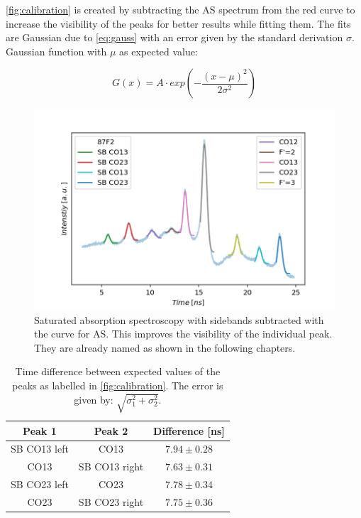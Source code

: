 \documentclass[]{article}
\begin{document}
\autoref{fig:calibration} is created by subtracting the AS spectrum from the red curve to increase the visibility of the peaks for better results while fitting them. The fits are Gaussian due to \autoref{eq:gauss} with an error given by the standard derivation $\sigma$. Gaussian function with $\mu$ as expected value:

\begin{equation}
G(x) = A \cdot exp\left( -\frac{(x-\mu)^2}{2\sigma^2} \right)
\end{equation}

\begin{figure}[H]
\centering
\includegraphics[width=.8\textwidth]{Plots/Calibration_Second_Real.png}
\caption{Saturated absorption spectroscopy with sidebands subtracted with the curve for AS. This improves the visibility of the individual peak. They are already named as shown in the following chapters.}
\label{fig:calibration}
\end{figure}

\begin{table}[H]
\centering
\begin{tabular}{c|c|c}

Peak 1 & Peak 2 & Difference [ns] \\ \hline\hline
SB CO13 left & CO13 & $7.94 \pm 0.28$ \\
CO13 & SB CO13 right & $7.63 \pm 0.31$ \\ \hline 
SB CO23 left & CO23  & $7.78 \pm 0.34$ \\
CO23 & SB CO23 right & $7.75 \pm 0.36$

\end{tabular}
\caption{Time difference between expected values of the peaks as labelled in \autoref{fig:calibration}. The error is given by: $\sqrt{\sigma_1^2 + \sigma_2^2}$.}
\label{tab:calc}
\end{table}
\end{document}
